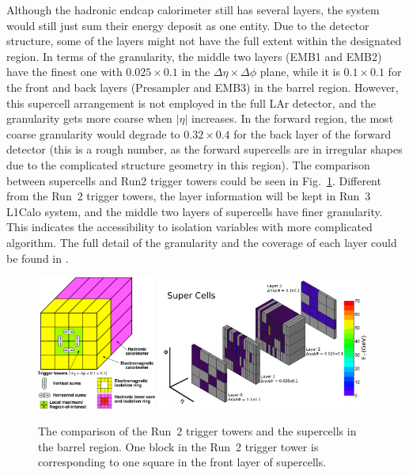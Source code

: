Although the hadronic endcap calorimeter still has several layers, the system would still just sum their energy deposit as one entity. Due to the detector structure, some of the layers might not have the full extent within the designated region. In terms of the granularity, the middle two layers (EMB1 and EMB2) have the finest one with $0.025\times 0.1$ in the $\Delta\eta\times\Delta\phi$ plane, while it is $0.1\times0.1$ for the front and back layers (Presampler and EMB3) in the barrel region. However, this supercell arrangement is not employed in the full LAr detector, and the granularity gets more coarse when $|\eta|$ increases. In the forward region, the most coarse granularity would degrade to $0.32\times0.4$ for the back layer of the forward detector (this is a rough number, as the forward supercells are in irregular shapes due to the complicated structure geometry in this region). The comparison between supercells and Run2 trigger towers could be seen in Fig.~\ref{Fig:tt_compar}. Different from the Run~2 trigger towers, the layer information will be kept in Run~3 L1Calo system, and the middle two layers of supercells have finer granularity. This indicates the accessibility to isolation variables with more complicated algorithm. The full detail of the granularity and the coverage of each layer could be found in \cite{Aleksa:1602230}.
\begin{figure}[!h]                
	\includegraphics[width=0.35\textwidth]{Chapter6/Run2TT.pdf}
	\includegraphics[width=0.62\textwidth]{Chapter6/Supercell.png}
	\begin{center}
		\caption{The comparison of the Run~2 trigger towers\cite{Aleksa:1602230} and the supercells\cite{Aaboud:2016leb} in the barrel region. One block in the Run~2 trigger tower is corresponding to one square in the front layer of supercells. }
		\label{Fig:tt_compar}            
	\end{center}
\end{figure}

